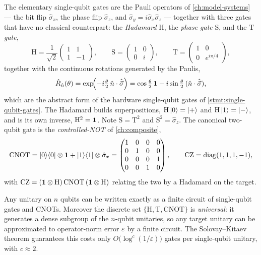 The elementary single-qubit gates are the Pauli operators of
\cref{ch:model-systems} --- the bit flip $\hat\sigma_x$, the phase flip
$\hat\sigma_z$, and $\hat\sigma_y=i\hat\sigma_x\hat\sigma_z$ --- together
with three gates that have no classical counterpart: the
\emph{Hadamard} $\mathrm{H}$, the \emph{phase gate} $\mathrm{S}$, and
the \emph{$\mathrm{T}$ gate},
\begin{equation}
\mathrm{H}=\frac{1}{\sqrt2}\begin{pmatrix}1&1\\1&-1\end{pmatrix},
\qquad
\mathrm{S}=\begin{pmatrix}1&0\\0&i\end{pmatrix},
\qquad
\mathrm{T}=\begin{pmatrix}1&0\\0&e^{i\pi/4}\end{pmatrix},
\end{equation}
together with the continuous rotations generated by the Paulis,
\begin{equation}
\label{eq:rotations}
\hat{R}_{\hat n}(\theta)
=\exp\!\Bigl(-i\tfrac{\theta}{2}\,\hat n\cdot\hat{\vec\sigma}\Bigr)
=\cos\tfrac{\theta}{2}\,\mathbf{1}
-i\sin\tfrac{\theta}{2}\,(\hat n\cdot\hat{\vec\sigma}),
\end{equation}
which are the abstract form of the hardware single-qubit gates of
\cref{stmt:single-qubit-gates}. The Hadamard builds superpositions,
$\mathrm{H}\ket{0}=\ket{+}$ and $\mathrm{H}\ket{1}=\ket{-}$, and is its
own inverse, $\mathrm{H}^2=\mathbf{1}$. Note $\mathrm{S}=\mathrm{T}^2$ and
$\mathrm{S}^2=\hat\sigma_z$. The canonical two-qubit gate is the
\emph{controlled-NOT} of \cref{ch:composite},
\begin{equation}
\mathrm{CNOT}
=\ket{0}\!\bra{0}\otimes\mathbf{1}+\ket{1}\!\bra{1}\otimes\hat\sigma_x
=\begin{pmatrix}1&0&0&0\\0&1&0&0\\0&0&0&1\\0&0&1&0\end{pmatrix},
\qquad
\mathrm{CZ}=\mathrm{diag}(1,1,1,-1),
\end{equation}
with $\mathrm{CZ}=(\mathbf{1}\otimes\mathrm{H})\,\mathrm{CNOT}\,(\mathbf{1}\otimes\mathrm{H})$
relating the two by a Hadamard on the target.

\begin{statement}
\label{stmt:universal-gates}
Any unitary on $n$ qubits can be written exactly as a finite circuit of
single-qubit gates and CNOTs. Moreover the discrete set
$\{\mathrm{H},\mathrm{T},\mathrm{CNOT}\}$ is \emph{universal}: it
generates a dense subgroup of the $n$-qubit unitaries, so any target
unitary can be approximated to operator-norm error $\varepsilon$ by a
finite circuit. The Solovay--Kitaev theorem guarantees this costs only
$O\!\bigl(\log^{c}(1/\varepsilon)\bigr)$ gates per single-qubit
unitary, with $c\approx 2$.
\end{statement}

